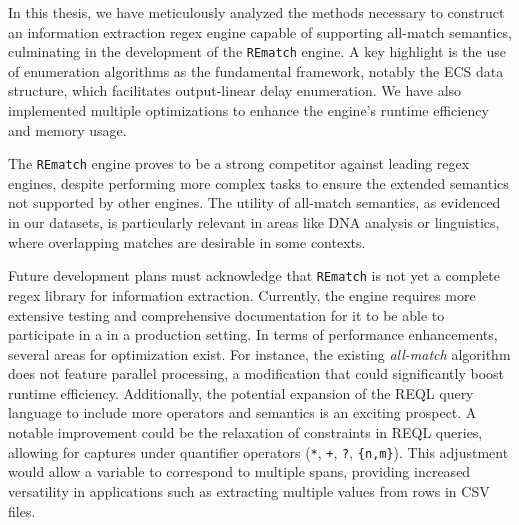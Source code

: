 
In this thesis, we have meticulously analyzed the methods necessary to construct
an information extraction regex engine capable of supporting all-match
semantics, culminating in the development of the \texttt{REmatch} engine. A key
highlight is the use of enumeration algorithms as the fundamental framework,
notably the ECS data structure, which facilitates output-linear delay
enumeration. We have also implemented multiple optimizations to enhance the
engine's runtime efficiency and memory usage.

The \texttt{REmatch} engine proves to be a strong competitor against leading
regex engines, despite performing more complex tasks to ensure the extended
semantics not supported by other engines. The utility of all-match semantics, as
evidenced in our datasets, is particularly relevant in areas like DNA analysis
or linguistics, where overlapping matches are desirable in some contexts.

Future development plans must acknowledge that \texttt{REmatch} is not yet a
complete regex library for information extraction. Currently, the engine
requires more extensive testing and comprehensive documentation for it to be
able to participate in a in a production setting. In terms of performance
enhancements, several areas for optimization exist. For instance, the existing
\textit{all-match} algorithm does not feature parallel processing, a
modification that could significantly boost runtime efficiency. Additionally,
the potential expansion of the REQL query language to include more operators and
semantics is an exciting prospect. A notable improvement could be the relaxation
of constraints in REQL queries, allowing for captures under quantifier operators
(\texttt{*}, \texttt{+}, \texttt{?}, \texttt{\{n,m\}}). This adjustment would
allow a variable to correspond to multiple spans, providing increased
versatility in applications such as extracting multiple values from rows in CSV
files.
